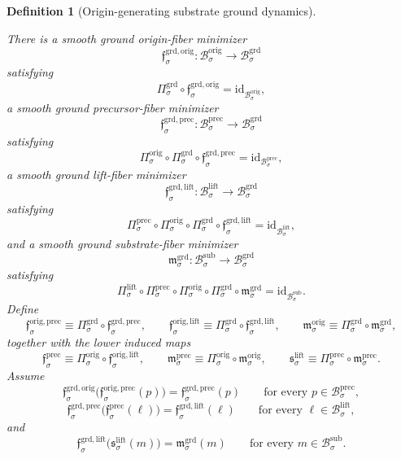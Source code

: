 \documentclass[11pt]{article}
\newcommand{\SubBody}[1]{\mathcal B_{#1}^{\mathrm{sub}}}
\newcommand{\LiftBody}[1]{\mathcal B_{#1}^{\mathrm{lift}}}
\newcommand{\LiftProj}[1]{\Pi_{#1}^{\mathrm{lift}}}
\newcommand{\LiftSelect}[1]{\mathfrak s_{#1}^{\mathrm{lift}}}
\newcommand{\PrecBody}[1]{\mathcal B_{#1}^{\mathrm{prec}}}
\newcommand{\PrecProj}[1]{\Pi_{#1}^{\mathrm{prec}}}
\newcommand{\PrecLiftMin}[1]{\mathfrak f_{#1}^{\mathrm{prec}}}
\newcommand{\PrecSubMin}[1]{\mathfrak m_{#1}^{\mathrm{prec}}}
\newcommand{\OrigBody}[1]{\mathcal B_{#1}^{\mathrm{orig}}}
\newcommand{\OrigProj}[1]{\Pi_{#1}^{\mathrm{orig}}}
\newcommand{\OrigPrecMin}[1]{\mathfrak f_{#1}^{\mathrm{orig,prec}}}
\newcommand{\OrigLiftMin}[1]{\mathfrak f_{#1}^{\mathrm{orig,lift}}}
\newcommand{\OrigSubMin}[1]{\mathfrak m_{#1}^{\mathrm{orig}}}
\newcommand{\GroundBody}[1]{\mathcal B_{#1}^{\mathrm{grd}}}
\newcommand{\GroundProj}[1]{\Pi_{#1}^{\mathrm{grd}}}
\newcommand{\GroundOrigMin}[1]{\mathfrak f_{#1}^{\mathrm{grd,orig}}}
\newcommand{\GroundPrecMin}[1]{\mathfrak f_{#1}^{\mathrm{grd,prec}}}
\newcommand{\GroundLiftMin}[1]{\mathfrak f_{#1}^{\mathrm{grd,lift}}}
\newcommand{\GroundSubMin}[1]{\mathfrak m_{#1}^{\mathrm{grd}}}
\newtheorem{definition}{Definition}
\begin{document}
\begin{definition}[Origin-generating substrate ground dynamics]
\begin{enumerate}
    There is a smooth ground origin-fiber minimizer
    \[
    \GroundOrigMin{\sigma}:\OrigBody{\sigma}\to\GroundBody{\sigma}
    \]
    satisfying
    \[
    \GroundProj{\sigma}\circ\GroundOrigMin{\sigma}
    =
    \mathrm{id}_{\OrigBody{\sigma}},
    \]
    a smooth ground precursor-fiber minimizer
    \[
    \GroundPrecMin{\sigma}:\PrecBody{\sigma}\to\GroundBody{\sigma}
    \]
    satisfying
    \[
    \OrigProj{\sigma}\circ\GroundProj{\sigma}\circ\GroundPrecMin{\sigma}
    =
    \mathrm{id}_{\PrecBody{\sigma}},
    \]
    a smooth ground lift-fiber minimizer
    \[
    \GroundLiftMin{\sigma}:\LiftBody{\sigma}\to\GroundBody{\sigma}
    \]
    satisfying
    \[
    \PrecProj{\sigma}\circ\OrigProj{\sigma}\circ\GroundProj{\sigma}\circ\GroundLiftMin{\sigma}
    =
    \mathrm{id}_{\LiftBody{\sigma}},
    \]
    and a smooth ground substrate-fiber minimizer
    \[
    \GroundSubMin{\sigma}:\SubBody{\sigma}\to\GroundBody{\sigma}
    \]
    satisfying
    \[
    \LiftProj{\sigma}\circ\PrecProj{\sigma}\circ\OrigProj{\sigma}\circ\GroundProj{\sigma}\circ\GroundSubMin{\sigma}
    =
    \mathrm{id}_{\SubBody{\sigma}}.
    \]
    Define
    \begin{equation}
    \OrigPrecMin{\sigma}
    \equiv
    \GroundProj{\sigma}\circ\GroundPrecMin{\sigma},
    \qquad
    \OrigLiftMin{\sigma}
    \equiv
    \GroundProj{\sigma}\circ\GroundLiftMin{\sigma},
    \qquad
    \OrigSubMin{\sigma}
    \equiv
    \GroundProj{\sigma}\circ\GroundSubMin{\sigma},
    \label{eq:groundinducedoriginmin}
    \end{equation}
    together with the lower induced maps
    \begin{equation}
    \PrecLiftMin{\sigma}
    \equiv
    \OrigProj{\sigma}\circ\OrigLiftMin{\sigma},
    \qquad
    \PrecSubMin{\sigma}
    \equiv
    \OrigProj{\sigma}\circ\OrigSubMin{\sigma},
    \qquad
    \LiftSelect{\sigma}
    \equiv
    \PrecProj{\sigma}\circ\PrecSubMin{\sigma}.
    \label{eq:groundinducedlowermin}
    \end{equation}
    Assume
    \begin{equation}
    \GroundOrigMin{\sigma}\bigl(\OrigPrecMin{\sigma}(p)\bigr)
    =
    \GroundPrecMin{\sigma}(p)
    \qquad
    \text{for every }p\in\PrecBody{\sigma},
    \label{eq:groundcompatorigprec}
    \end{equation}
    \begin{equation}
    \GroundPrecMin{\sigma}\bigl(\PrecLiftMin{\sigma}(\ell)\bigr)
    =
    \GroundLiftMin{\sigma}(\ell)
    \qquad
    \text{for every }\ell\in\LiftBody{\sigma},
    \label{eq:groundcompatpreclift}
    \end{equation}
    and
    \begin{equation}
    \GroundLiftMin{\sigma}\bigl(\LiftSelect{\sigma}(m)\bigr)
    =
    \GroundSubMin{\sigma}(m)
    \qquad
    \text{for every }m\in\SubBody{\sigma}.
    \label{eq:groundcompatliftsub}
    \end{equation}


\end{enumerate}
\end{definition}
\end{document}
